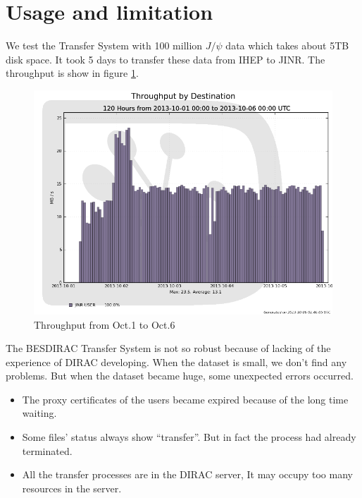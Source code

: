 \section{Usage and limitation}
We test the Transfer System with 100 million $J/\psi$ data 
which takes about 5TB disk space. It took 5 days to transfer 
these data from IHEP to JINR. The throughput is show in 
figure \ref{fig:throughput}.

\begin{figure}
    \begin{center}
        \includegraphics[width=\textwidth, keepaspectratio]{data/throughput-dest-1001-10-06.png}
    \end{center}
    \caption{\label{fig:throughput}Throughput from Oct.1 to Oct.6}
\end{figure}

The BESDIRAC Transfer System is not so robust
because of lacking of the experience of DIRAC developing.
When the dataset is small, we don't find any problems.
But when the dataset became huge, some unexpected errors occurred.
\begin{itemize}
    \item The proxy certificates of the users became expired
            because of the long time waiting.
    \item Some files' status always show ``transfer''.
            But in fact the process had already terminated.
    \item All the transfer processes are in the DIRAC server,
            It may occupy too many resources in the server.
\end{itemize}
